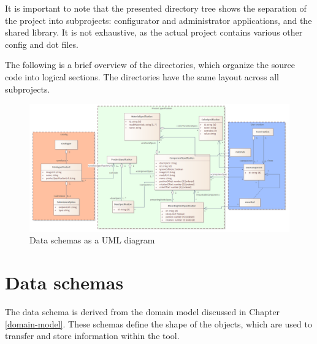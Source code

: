 It is important to note that the presented directory tree shows the separation of the project into subprojects: configurator and administrator applications, and the shared library. It is not exhaustive, as the actual project contains various other config and dot files.

The following is a brief overview of the  directories, which organize the source code into logical sections. The directories have the same layout across all subprojects.

\vspace{12pt}
\vspace{16pt}

\begin{landscape}
\begin{figure}[h]
\centering
\includegraphics[width=\linewidth]{images/uml_dataschema.png}
\caption{Data schemas as a UML diagram}
\label{fig:data-schema}
\end{figure}
\end{landscape}

\section{Data schemas}

The data schema is derived from the domain model discussed in Chapter \ref{domain-model}. These schemas define the shape of the objects, which are used to transfer and store information within the tool. 

